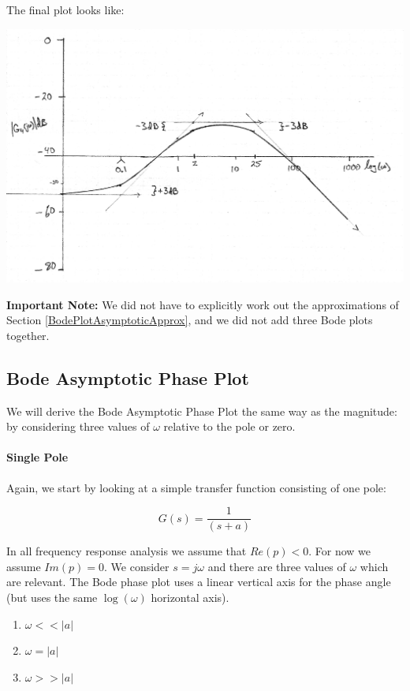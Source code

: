 \begin{ExampleCont}
The final plot looks like:

\includegraphics[width=6.5in]{figs05/00739a.png}


{\bf Important Note: }  We did not have to explicitly work out the approximations of Section \ref{BodePlotAsymptoticApprox},
and we did not add three Bode plots together.


\end{ExampleCont}




\subsection{Bode Asymptotic Phase Plot}

We will derive the Bode Asymptotic Phase Plot the same way as the magnitude: by considering three values of $\omega$ relative to the pole or zero.

\paragraph{Single Pole}

Again, we start by looking at a simple transfer function consisting of one pole:

\[
G(s) = \frac{1}{(s+a)}
\]

In all frequency response analysis we assume that $Re(p) < 0$.  For now we assume $Im(p) = 0$.
We consider $s=j\omega$ and there are three values of $\omega$ which are relevant.
The Bode phase  plot uses a linear vertical axis for the phase angle (but uses the same $\log(\omega)$ horizontal axis).

\begin{enumerate}
  \item  $\omega << |a|$
  \item  $\omega = |a|$
  \item  $\omega >> |a|$
\end{enumerate}


